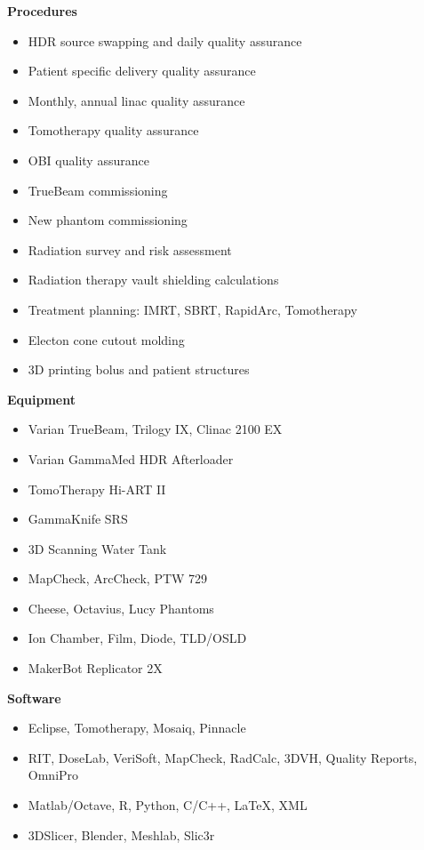 \documentclass[letterpaper,10pt]{article}
\newcommand{\resheading}[1]{{\large \colorbox{mygrey}{\begin{minipage}{\textwidth}{\textbf{#1 \vphantom{p\^{E}}}}\end{minipage}}}}
\begin{document}
\resheading{Procedures}
	\begin{itemize}[noitemsep]
	    \item {\footnotesize HDR source swapping and daily quality assurance}
	    \item {\footnotesize Patient specific delivery quality assurance}
	    \item {\footnotesize Monthly, annual linac quality assurance}
	    \item {\footnotesize Tomotherapy quality assurance}
	    \item {\footnotesize OBI quality assurance}
	    \item {\footnotesize TrueBeam commissioning}
	    \item {\footnotesize New phantom commissioning}
	    \item {\footnotesize Radiation survey and risk assessment}
	    \item {\footnotesize Radiation therapy vault shielding calculations}
	    \item {\footnotesize Treatment planning: IMRT, SBRT, RapidArc, Tomotherapy}
	    \item {\footnotesize Electon cone cutout molding}
	    \item {\footnotesize 3D printing bolus and patient structures}
	\end{itemize}  %

\resheading{Equipment}
	\begin{itemize}[noitemsep]
	    \item {\footnotesize Varian TrueBeam, Trilogy IX, Clinac 2100 EX}
	    \item {\footnotesize Varian GammaMed HDR Afterloader}
	    \item {\footnotesize TomoTherapy Hi-ART II}
	    \item {\footnotesize GammaKnife SRS}
	    \item {\footnotesize 3D Scanning Water Tank}
	    \item {\footnotesize MapCheck, ArcCheck, PTW 729}
	    \item {\footnotesize Cheese, Octavius, Lucy Phantoms}
	    \item {\footnotesize Ion Chamber, Film, Diode, TLD/OSLD}
	    \item {\footnotesize MakerBot Replicator 2X}
	\end{itemize}  %

\resheading{Software}
	\begin{itemize}[noitemsep]
	    \item {\footnotesize Eclipse, Tomotherapy, Mosaiq, Pinnacle}
	    \item {\footnotesize RIT, DoseLab, VeriSoft, MapCheck, RadCalc, 3DVH, Quality Reports, OmniPro}
	    \item {\footnotesize Matlab/Octave, R, Python, C/C++, LaTeX, XML}
	    \item {\footnotesize 3DSlicer, Blender, Meshlab, Slic3r}
	\end{itemize}  %
\end{document}
